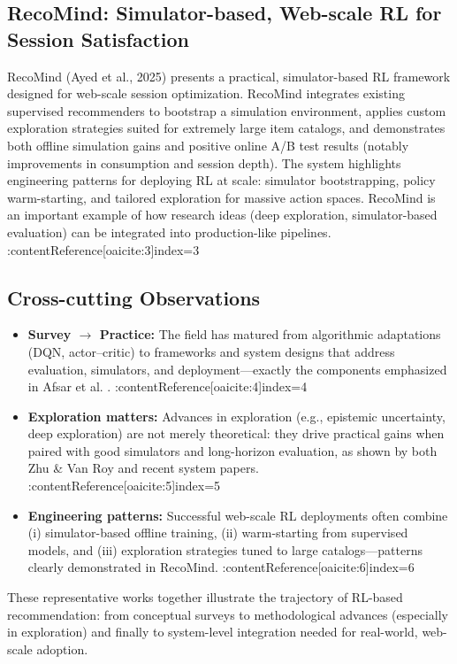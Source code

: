 \subsection{RecoMind: Simulator-based, Web-scale RL for Session Satisfaction}

RecoMind (Ayed et al., 2025) presents a practical, simulator-based RL framework designed for web-scale session optimization. RecoMind integrates existing supervised recommenders to bootstrap a simulation environment, applies custom exploration strategies suited for extremely large item catalogs, and demonstrates both offline simulation gains and positive online A/B test results (notably improvements in consumption and session depth). The system highlights engineering patterns for deploying RL at scale: simulator bootstrapping, policy warm-starting, and tailored exploration for massive action spaces. RecoMind is an important example of how research ideas (deep exploration, simulator-based evaluation) can be integrated into production-like pipelines. \cite{Ayed2025RecoMind} :contentReference[oaicite:3]{index=3}

\subsection{Cross-cutting Observations}

\begin{itemize}
    \item \textbf{Survey $\rightarrow$ Practice:} The field has matured from algorithmic adaptations (DQN, actor--critic) to frameworks and system designs that address evaluation, simulators, and deployment—exactly the components emphasized in Afsar et al. \cite{Afsar2021Survey}. :contentReference[oaicite:4]{index=4}
    \item \textbf{Exploration matters:} Advances in exploration (e.g., epistemic uncertainty, deep exploration) are not merely theoretical: they drive practical gains when paired with good simulators and long-horizon evaluation, as shown by both Zhu \& Van Roy and recent system papers. \cite{Zhu2021DeepExploration,Ayed2025RecoMind} :contentReference[oaicite:5]{index=5}
    \item \textbf{Engineering patterns:} Successful web-scale RL deployments often combine (i) simulator-based offline training, (ii) warm-starting from supervised models, and (iii) exploration strategies tuned to large catalogs—patterns clearly demonstrated in RecoMind. \cite{Ayed2025RecoMind} :contentReference[oaicite:6]{index=6}
\end{itemize}

These representative works together illustrate the trajectory of RL-based recommendation: from conceptual surveys to methodological advances (especially in exploration) and finally to system-level integration needed for real-world, web-scale adoption.
